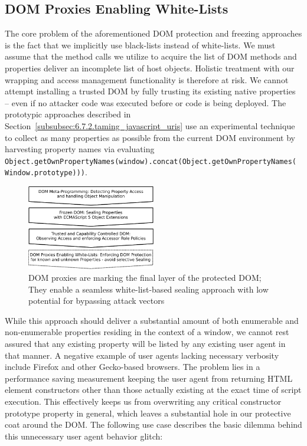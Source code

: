     \subsection{DOM Proxies Enabling White-Lists}
    \label{subsubsec:6.7.3.dom_proxies_enabling_whitelists}

    The core problem of the aforementioned DOM protection and freezing approaches is the fact that we implicitly use black-lists instead of white-lists. We must assume that the method calls we utilize to acquire the list of DOM methods and properties deliver an incomplete list of host objects. Holistic treatment with our wrapping and access management functionality is therefore at risk. We cannot attempt installing a trusted DOM by fully trusting its existing native properties -- even if no attacker code was executed before or code is being deployed. The prototypic approaches described in Section~\ref{subsubsec:6.7.2.taming_javascript_uris} use an experimental technique to collect as many properties as possible from the current DOM environment by harvesting property names via evaluating  \texttt{Object.getOwnPropertyNames(window).concat(Object.getOwnPropertyNames(\\
    Window.prototype)))}. \\

\begin{figure}[htb]
\centering
\includegraphics[width=0.5\textwidth]{./img/dom-protect-4.pdf}
\caption{DOM proxies are marking the final layer of the protected DOM; They enable a seamless white-list-based sealing approach with low potential for bypassing attack vectors}
\label{fig:dom-protect-4}
\end{figure}

    While this approach should deliver a substantial amount of both enumerable and non-enumerable properties residing in the context of a window, we cannot rest assured that any existing property will be listed by any existing user agent in that manner. A negative example of user agents lacking necessary verbosity include Firefox and other Gecko-based browsers. The problem lies in a performance saving measurement keeping the user agent from returning HTML element constructors other than those actually existing at the exact time of script execution. This effectively keeps us from overwriting any critical constructor prototype property in general, which leaves a substantial hole in our protective coat around the DOM. The following use case describes the basic dilemma behind this unnecessary user agent behavior glitch:

